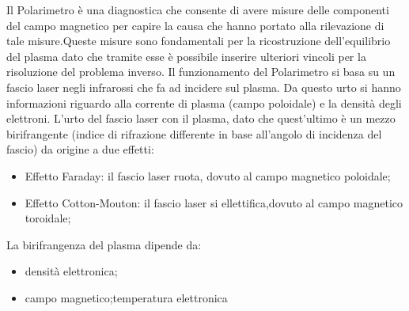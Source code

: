 \documentclass{article}
\begin{document}

Il Polarimetro è una diagnostica che consente di avere misure delle componenti del campo magnetico per capire la causa che hanno portato alla rilevazione di tale misure.Queste misure sono fondamentali per la ricostruzione dell'equilibrio del plasma dato che tramite esse è possibile inserire ulteriori vincoli per la risoluzione del problema inverso.\newline
Il funzionamento del Polarimetro si basa su un fascio laser negli infrarossi che fa ad incidere sul plasma. Da questo urto si hanno informazioni riguardo alla corrente di plasma (campo poloidale) e la densità degli elettroni.\newline
L'urto del fascio laser con il plasma, dato che quest'ultimo è un mezzo birifrangente (indice di rifrazione differente in base all'angolo di incidenza del fascio) da origine a due effetti:
\begin{itemize}
	\item Effetto Faraday: il fascio laser ruota, dovuto al campo magnetico poloidale;
	\item Effetto Cotton-Mouton: il fascio laser si ellettifica,dovuto al campo magnetico toroidale;
\end{itemize}
La birifrangenza del plasma dipende da:
\begin{itemize}
	\item densità elettronica;
	\item campo magnetico;temperatura elettronica
\end{itemize}
\end{document}
